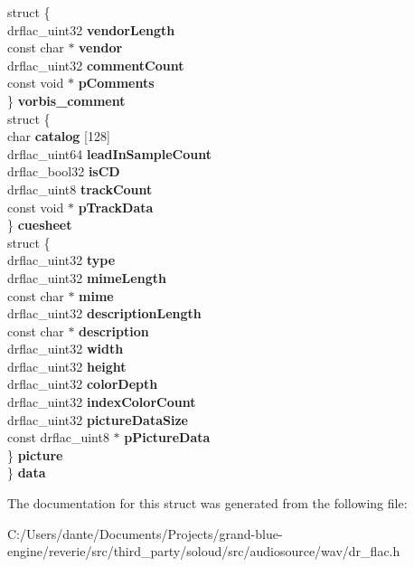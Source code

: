 \begin{DoxyCompactItemize}
\begin{tabbing}
\>struct \{\\
\>\>drflac\_uint32 {\bfseries vendorLength}\\
\>\>const char $\ast$ {\bfseries vendor}\\
\>\>drflac\_uint32 {\bfseries commentCount}\\
\>\>const void $\ast$ {\bfseries pComments}\\
\>\} {\bfseries vorbis\_comment}\\
\>struct \{\\
\>\>char {\bfseries catalog} \mbox{[}128\mbox{]}\\
\>\>drflac\_uint64 {\bfseries leadInSampleCount}\\
\>\>drflac\_bool32 {\bfseries isCD}\\
\>\>drflac\_uint8 {\bfseries trackCount}\\
\>\>const void $\ast$ {\bfseries pTrackData}\\
\>\} {\bfseries cuesheet}\\
\>struct \{\\
\>\>drflac\_uint32 {\bfseries type}\\
\>\>drflac\_uint32 {\bfseries mimeLength}\\
\>\>const char $\ast$ {\bfseries mime}\\
\>\>drflac\_uint32 {\bfseries descriptionLength}\\
\>\>const char $\ast$ {\bfseries description}\\
\>\>drflac\_uint32 {\bfseries width}\\
\>\>drflac\_uint32 {\bfseries height}\\
\>\>drflac\_uint32 {\bfseries colorDepth}\\
\>\>drflac\_uint32 {\bfseries indexColorCount}\\
\>\>drflac\_uint32 {\bfseries pictureDataSize}\\
\>\>const drflac\_uint8 $\ast$ {\bfseries pPictureData}\\
\>\} {\bfseries picture}\\
\} {\bfseries data}\\

\end{tabbing}\end{DoxyCompactItemize}


The documentation for this struct was generated from the following file\+:\begin{DoxyCompactItemize}
\item 
C\+:/\+Users/dante/\+Documents/\+Projects/grand-\/blue-\/engine/reverie/src/third\+\_\+party/soloud/src/audiosource/wav/dr\+\_\+flac.\+h\end{DoxyCompactItemize}
